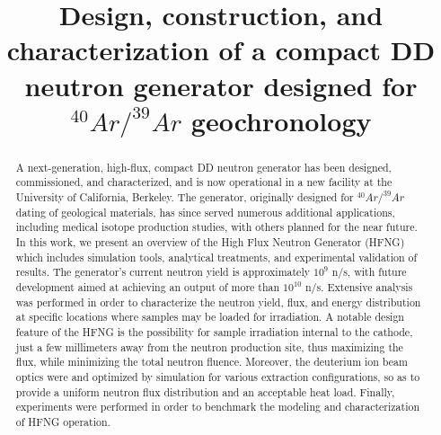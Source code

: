 \documentclass[review]{elsarticle}
\begin{document}
	
	\begin{frontmatter}
		
	\title{Design, construction, and characterization of a compact DD neutron generator designed for $^{40}Ar/^{39}Ar$ geochronology}

	
\begin{abstract}
	
A  next-generation, high-flux, compact DD neutron generator has been designed, commissioned, and characterized, and is now operational in a new facility  at the University of California, Berkeley. The generator, originally designed for $^{40}Ar/^{39}Ar$ dating of geological materials, has since served numerous additional applications, including medical isotope production studies, with others  planned for the near future. In this work, we present an overview of the High Flux Neutron Generator (HFNG) which includes simulation tools, analytical treatments, and experimental validation of results. The generator's current neutron yield is approximately $10^9$ n/s, with future development aimed at achieving an output of more than $10^{10}$ n/s. Extensive analysis was performed in order to characterize the neutron yield, flux, and energy distribution at specific locations where samples may be loaded for irradiation. A notable design feature of the HFNG is the possibility for  sample  irradiation internal to the cathode, just a few millimeters away from the neutron production site, thus maximizing the flux, while minimizing the total neutron fluence. Moreover, the deuterium ion beam optics were  and optimized by simulation for various extraction configurations, so as to provide a uniform neutron flux distribution and an acceptable heat load. Finally, experiments were performed in order to benchmark the modeling and characterization of HFNG operation.   


\end{abstract}
\end{frontmatter}
\end{document}
